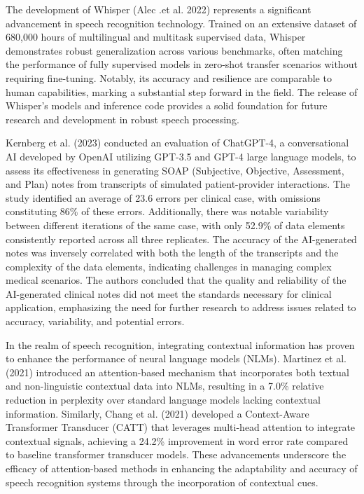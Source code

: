 \documentclass[12pt,a4paper]{article}
\begin{document}
The development of Whisper (Alec .et al. 2022\cite{radford2022robust})
represents a significant advancement in speech recognition technology. Trained
on an extensive dataset of 680,000 hours of multilingual and multitask
supervised data, Whisper demonstrates robust generalization across various
benchmarks, often matching the performance of fully supervised models in
zero-shot transfer scenarios without requiring fine-tuning. Notably, its
accuracy and resilience are comparable to human capabilities, marking a
substantial step forward in the field. The release of Whisper's models and
inference code provides a solid foundation for future research and development
in robust speech processing.

Kernberg et al. (2023) \cite{biswas2024intelligent} conducted an evaluation of
ChatGPT-4, a conversational AI developed by OpenAI utilizing GPT-3.5 and GPT-4
large language models, to assess its effectiveness in generating SOAP
(Subjective, Objective, Assessment, and Plan) notes from transcripts of
simulated patient-provider interactions. The study identified an average of 23.6
errors per clinical case, with omissions constituting 86\% of these errors.
Additionally, there was notable variability between different iterations of the
same case, with only 52.9\% of data elements consistently reported across all
three replicates. The accuracy of the AI-generated notes was inversely
correlated with both the length of the transcripts and the complexity of the
data elements, indicating challenges in managing complex medical scenarios. The
authors concluded that the quality and reliability of the AI-generated clinical
notes did not meet the standards necessary for clinical application, emphasizing
the need for further research to address issues related to accuracy,
variability, and potential errors.

In the realm of speech recognition, integrating contextual information has
proven to enhance the performance of neural language models (NLMs). Martinez et
al. (2021) \cite{martinez2021attention} introduced an attention-based mechanism
that incorporates both textual and non-linguistic contextual data into NLMs,
resulting in a 7.0\% relative reduction in perplexity over standard language
models lacking contextual information. Similarly, Chang et al. (2021)
\cite{chang2021context} developed a Context-Aware Transformer Transducer (CATT)
that leverages multi-head attention to integrate contextual signals, achieving a
24.2\% improvement in word error rate compared to baseline transformer
transducer models. These advancements underscore the efficacy of attention-based
methods in enhancing the adaptability and accuracy of speech recognition systems
through the incorporation of contextual cues.
\end{document}
